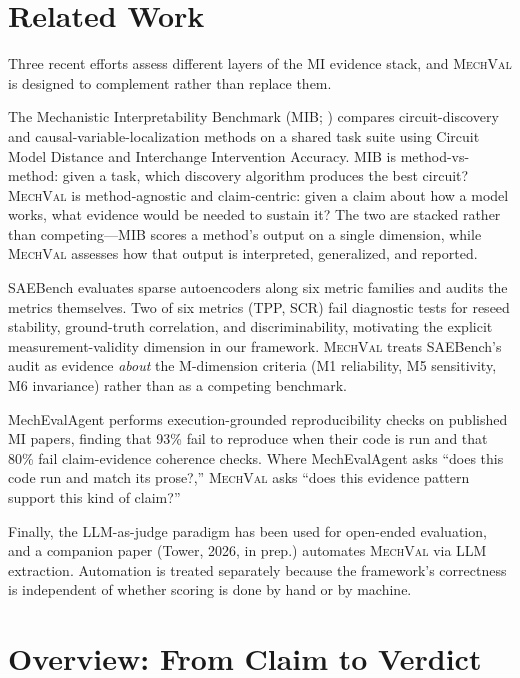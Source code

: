 \documentclass[10pt]{article}
\newcommand{\mechval}{\textsc{MechVal}}
\begin{document}
\section{Related Work}
\label{sec:related}

Three recent efforts assess different layers of the MI evidence stack, and \mechval{} is designed to complement rather than replace them.

The Mechanistic Interpretability Benchmark (MIB; \citealp{mueller2025mib}) compares circuit-discovery and causal-variable-localization methods on a shared task suite using Circuit Model Distance and Interchange Intervention Accuracy. MIB is method-vs-method: given a task, which discovery algorithm produces the best circuit? \mechval{} is method-agnostic and claim-centric: given a claim about how a model works, what evidence would be needed to sustain it? The two are stacked rather than competing---MIB scores a method's output on a single dimension, while \mechval{} assesses how that output is interpreted, generalized, and reported.

SAEBench \citep{karvonen2025saebench} evaluates sparse autoencoders along six metric families and audits the metrics themselves. Two of six metrics (TPP, SCR) fail diagnostic tests for reseed stability, ground-truth correlation, and discriminability, motivating the explicit measurement-validity dimension in our framework. \mechval{} treats SAEBench's audit as evidence \emph{about} the M-dimension criteria (M1 reliability, M5 sensitivity, M6 invariance) rather than as a competing benchmark.

MechEvalAgent \citep{bai2026mecheval} performs execution-grounded reproducibility checks on published MI papers, finding that 93\% fail to reproduce when their code is run and that 80\% fail claim-evidence coherence checks. Where MechEvalAgent asks ``does this code run and match its prose?,'' \mechval{} asks ``does this evidence pattern support this kind of claim?''

Finally, the LLM-as-judge paradigm \citep{zheng2023judging} has been used for open-ended evaluation, and a companion paper (Tower, 2026, in prep.) automates \mechval{} via LLM extraction. Automation is treated separately because the framework's correctness is independent of whether scoring is done by hand or by machine.

\section{Overview: From Claim to Verdict}
\label{sec:overview}
\end{document}
